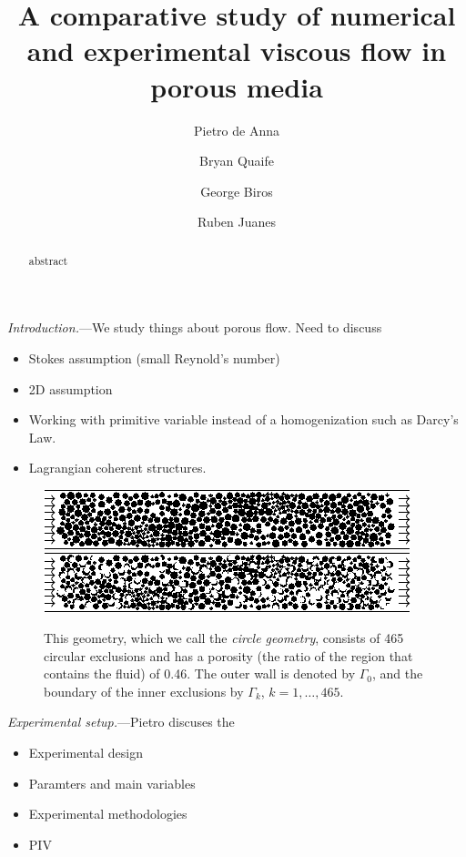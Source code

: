 \documentclass[twocolumn,showpacs,pre,preprintnumbers,floatfix]{revtex4-1}
\newif\ifTikz
\begin{document}
\title{A comparative study of numerical and experimental viscous flow
in porous media}

\author{Pietro de Anna}
\author{Bryan Quaife}
\author{George Biros}
\author{Ruben Juanes}

\begin{abstract}
abstract
\end{abstract}

\maketitle

{\em Introduction.}---We study things about porous flow.  Need to
discuss
\begin{itemize}
  \item Stokes assumption (small Reynold's number)
  \item 2D assumption
  \item Working with primitive variable instead of a homogenization such
  as Darcy's Law.
  \item Lagrangian coherent structures.
\end{itemize}
\begin{figure}[htps]
\ifTikz
\centering
  
  
\else
  \includegraphics{circleGrains.pdf}
  \includegraphics{beanGrains.pdf}
\fi
\caption{\label{f:beans} This geometry, which we call the {\em circle
geometry}, consists of 465 circular exclusions and has a porosity (the
ratio of the region that contains the fluid) of 0.46.  The outer wall
is denoted by $\Gamma_{0}$, and the boundary of the inner exclusions by
$\Gamma_{k}$, $k=1,\ldots,465$.}
\end{figure}


{\em Experimental setup.}---Pietro discuses the
\begin{itemize}
  \item Experimental design
  \item Paramters and main variables
  \item Experimental methodologies
  \item PIV
\end{itemize}
\end{document}
